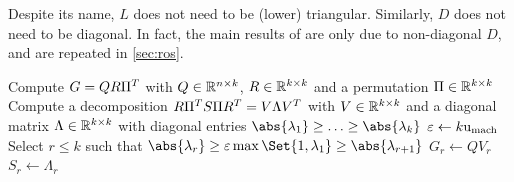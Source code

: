 \begin{remark}
  Despite its name, $L$ does not need to be (lower) triangular.
  Similarly, $D$ does not need to be diagonal.
  In fact, the main results of \cite{Lang2015} are only due to non-diagonal $D$,
  and are repeated in \autoref{sec:ros}.
\end{remark}

\begin{algorithm}[t]
  \caption[Column compression for \aclp*{LRSIF}]{%
    Column compression for \ac{LRSIF}
  }
  \label{alg:lowrank:compression}
  Compute $G=QR\Pi^T$ with $Q\in\mathbb{R}^{n\times k}$, $R\in\mathbb{R}^{k\times k}$ and a permutation $\Pi\in\mathbb{R}^{k\times k}$\;
  Compute a decomposition $R \Pi^T S \Pi R^T = V \Lambda V^T$ with $V \in \mathbb{R}^{k\times k}$
  and a diagonal matrix $\Lambda\in\mathbb{R}^{k\times k}$ with diagonal entries $\abs{\lambda_1}\geq\ldots\geq\abs{\lambda_k}$\;
  $\varepsilon \gets k \mathrm u_\text{mach}$\;
  Select $r \leq k$ such that $\abs{\lambda_r} \geq \epsilon\max\Set{1, \lambda_1} \geq \abs{\lambda_{r+1}}$\;
  $G_r \gets Q V_r$\;
  $S_r \gets \Lambda_r$\;
\end{algorithm}

